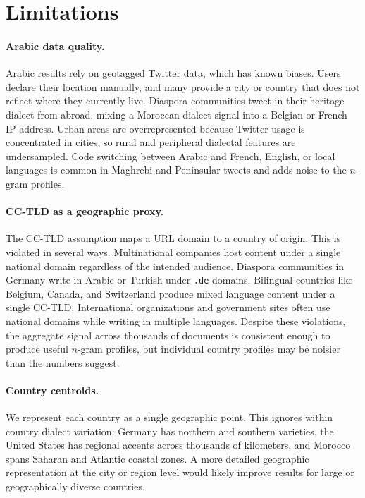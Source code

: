 \documentclass[11pt]{article}
\begin{document}
\section*{Limitations}

\paragraph{Arabic data quality.}
Arabic results rely on geotagged Twitter data, which has known biases.
Users declare their location manually, and many provide a city or country that does not reflect where they currently live.
Diaspora communities tweet in their heritage dialect from abroad, mixing a Moroccan dialect signal into a Belgian or French IP address.
Urban areas are overrepresented because Twitter usage is concentrated in cities, so rural and peripheral dialectal features are undersampled.
Code switching between Arabic and French, English, or local languages is common in Maghrebi and Peninsular tweets and adds noise to the $n$-gram profiles.

\paragraph{CC-TLD as a geographic proxy.}
The CC-TLD assumption maps a URL domain to a country of origin.
This is violated in several ways.
Multinational companies host content under a single national domain regardless of the intended audience.
Diaspora communities in Germany write in Arabic or Turkish under \texttt{.de} domains.
Bilingual countries like Belgium, Canada, and Switzerland produce mixed language content under a single CC-TLD.
International organizations and government sites often use national domains while writing in multiple languages.
Despite these violations, the aggregate signal across thousands of documents is consistent enough to produce useful $n$-gram profiles, but individual country profiles may be noisier than the numbers suggest.

\paragraph{Country centroids.}
We represent each country as a single geographic point.
This ignores within country dialect variation: Germany has northern and southern varieties, the United States has regional accents across thousands of kilometers, and Morocco spans Saharan and Atlantic coastal zones.
A more detailed geographic representation at the city or region level would likely improve results for large or geographically diverse countries.
\end{document}
